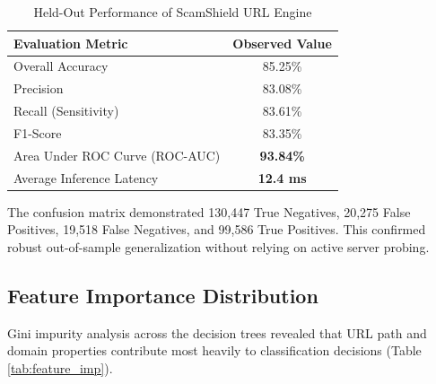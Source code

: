 \documentclass[conference]{IEEEtran}
\begin{document}
\begin{table}[htbp]
\caption{Held-Out Performance of ScamShield URL Engine}
\begin{center}
\begin{tabular}{lc}
\toprule
\textbf{Evaluation Metric} & \textbf{Observed Value} \\
\midrule
Overall Accuracy & 85.25\% \\
Precision & 83.08\% \\
Recall (Sensitivity) & 83.61\% \\
F1-Score & 83.35\% \\
Area Under ROC Curve (ROC-AUC) & \textbf{93.84\%} \\
Average Inference Latency & \textbf{12.4 ms} \\
\bottomrule
\end{tabular}
\label{tab:url_perf}
\end{center}
\end{table}

The confusion matrix demonstrated 130,447 True Negatives, 20,275 False Positives, 19,518 False Negatives, and 99,586 True Positives. This confirmed robust out-of-sample generalization without relying on active server probing.

\subsection{Feature Importance Distribution}
Gini impurity analysis across the decision trees revealed that URL path and domain properties contribute most heavily to classification decisions (Table \ref{tab:feature_imp}).
\end{document}
